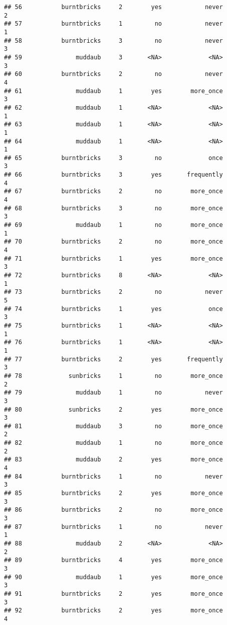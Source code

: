 \documentclass[
]{article}
\begin{document}
\begin{verbatim}
## 56           burntbricks     2        yes            never         2
## 57           burntbricks     1         no            never         1
## 58           burntbricks     3         no            never         3
## 59               muddaub     3       <NA>             <NA>         3
## 60           burntbricks     2         no            never         4
## 61               muddaub     1        yes        more_once         3
## 62               muddaub     1       <NA>             <NA>         1
## 63               muddaub     1       <NA>             <NA>         1
## 64               muddaub     1       <NA>             <NA>         1
## 65           burntbricks     3         no             once         3
## 66           burntbricks     3        yes       frequently         4
## 67           burntbricks     2         no        more_once         4
## 68           burntbricks     3         no        more_once         3
## 69               muddaub     1         no        more_once         1
## 70           burntbricks     2         no        more_once         4
## 71           burntbricks     1        yes        more_once         3
## 72           burntbricks     8       <NA>             <NA>         1
## 73           burntbricks     2         no            never         5
## 74           burntbricks     1        yes             once         3
## 75           burntbricks     1       <NA>             <NA>         1
## 76           burntbricks     1       <NA>             <NA>         1
## 77           burntbricks     2        yes       frequently         3
## 78             sunbricks     1         no        more_once         2
## 79               muddaub     1         no            never         3
## 80             sunbricks     2        yes        more_once         3
## 81               muddaub     3         no        more_once         2
## 82               muddaub     1         no        more_once         2
## 83               muddaub     2        yes        more_once         4
## 84           burntbricks     1         no            never         3
## 85           burntbricks     2        yes        more_once         3
## 86           burntbricks     2         no        more_once         3
## 87           burntbricks     1         no            never         1
## 88               muddaub     2       <NA>             <NA>         2
## 89           burntbricks     4        yes        more_once         3
## 90               muddaub     1        yes        more_once         3
## 91           burntbricks     2        yes        more_once         3
## 92           burntbricks     2        yes        more_once         4

\end{verbatim}
\end{document}
